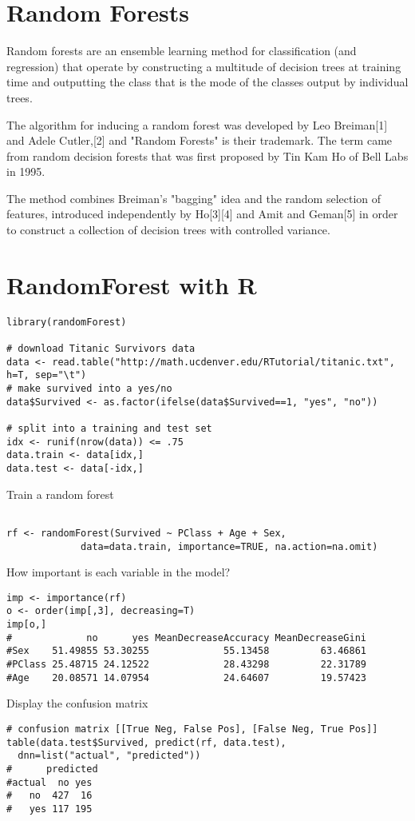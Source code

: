 \documentclass[french]{article}
\begin{document}
\section{Random Forests}

Random forests are an ensemble learning method for classification (and regression) that operate by constructing a multitude of decision trees at training time and outputting the class that is the mode of the classes output by individual trees.

 The algorithm for inducing a random forest was developed by Leo Breiman[1] and Adele Cutler,[2] and "Random Forests" is their trademark. The term came from random decision forests that was first proposed by Tin Kam Ho of Bell Labs in 1995. 
 
 The method combines Breiman's "bagging" idea and the random selection of features, introduced independently by Ho[3][4] and Amit and Geman[5] in order to construct a collection of decision trees with controlled variance.

\section{RandomForest with R}
\begin{framed}
\begin{verbatim}
library(randomForest)
 
# download Titanic Survivors data
data <- read.table("http://math.ucdenver.edu/RTutorial/titanic.txt", h=T, sep="\t")
# make survived into a yes/no
data$Survived <- as.factor(ifelse(data$Survived==1, "yes", "no"))                 
 
# split into a training and test set
idx <- runif(nrow(data)) <= .75
data.train <- data[idx,]
data.test <- data[-idx,]
\end{verbatim}
\end{framed} 
Train a random forest
\begin{framed}
\begin{verbatim} 

rf <- randomForest(Survived ~ PClass + Age + Sex, 
             data=data.train, importance=TRUE, na.action=na.omit)
\end{verbatim}
\end{framed} 
How important is each variable in the model?
\begin{framed}
\begin{verbatim}
imp <- importance(rf)
o <- order(imp[,3], decreasing=T)
imp[o,]
#             no      yes MeanDecreaseAccuracy MeanDecreaseGini
#Sex    51.49855 53.30255             55.13458         63.46861
#PClass 25.48715 24.12522             28.43298         22.31789
#Age    20.08571 14.07954             24.64607         19.57423
\end{verbatim}
\end{framed} 
Display the confusion matrix
\begin{framed}
\begin{verbatim} 
# confusion matrix [[True Neg, False Pos], [False Neg, True Pos]]
table(data.test$Survived, predict(rf, data.test),
  dnn=list("actual", "predicted"))
#      predicted
#actual  no yes
#   no  427  16
#   yes 117 195
\end{verbatim}
\end{framed}
\end{document}
